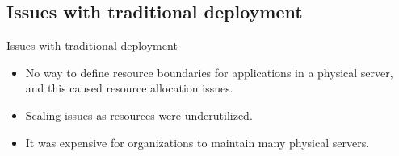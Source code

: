 \subsection{Issues with traditional deployment}\label{subsec:issues-with-traditional-deployment}
\begin{frame}{Issues with traditional deployment}
    \begin{itemize}[<+- | alert@+>]
        \item No way to define resource boundaries for applications in a physical server, and this caused resource allocation issues.
        \item Scaling issues as resources were underutilized.
        \item It was expensive for organizations to maintain many physical servers.
    \end{itemize}
\end{frame}
